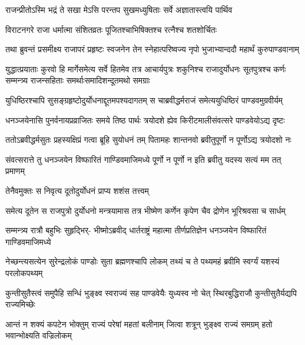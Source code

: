 \twolineshloka
{राजन्प्रीतोऽस्मि भद्रं ते सखा मेऽसि परन्तप}
{सुखमध्युषिताः सर्वे अज्ञातास्त्वयि पार्थिव}



\twolineshloka
{विराटनगरे राजा धर्मात्मा संशितव्रतः}
{पूजितश्चाभिषिक्तश्च रत्नैश्च शतशोर्चितः}


\twolineshloka
{तथा ब्रुवन्तं प्रसमीक्ष्य राजापरं प्रहृष्टः स्वजनेन तेन}
{स्नेहात्परिष्वज्य नृपो भुजाभ्यान्ददौ महार्थं कुरुपाण्डवानाम्}


\threelineshloka
{युद्धात्प्रयाताः कुरवो हि मार्गेसमेत्य सर्वे हितमेव तत्र}
{आचार्यपुत्रः शकुनिश्च राजादुर्योधनः सूतपुत्रश्च कर्णः}
{सम्मन्त्र्य राजन्सहिताः समर्थाःसमादिशन्दूतमथो समग्राः}


\twolineshloka
{युधिष्ठिरश्चापि सुसङ्ग्रहृष्टोदुर्योधनाद्दूतमपश्यदागतम्}
{स चाब्रवीद्धर्मराजं समेत्ययुधिष्ठिरं पाण्डवमुग्रवीर्यम्}


\twolineshloka
{धनञ्जयेनासि पुनर्वनायप्रव्राजितः समये तिष्ठ पार्थः}
{त्रयोदशे ह्येव किरीटमालीसंवत्सरे पाण्डवेयोऽद्य दृष्टः}



\twolineshloka
{ततोऽब्रवीद्धर्मसुतः प्रहस्यक्षिप्रं गत्वा ब्रूहि सुयोधनं तम्}
{पितामहः शान्तनवो ब्रवीतुपूर्णो न पूर्णोऽद्य त्रयोदशो नः}


\fourlineindentedshloka
{संवत्सरात्ते तु धनञ्जयेन}
{विष्फारितं गाण्डिवमाजिमध्ये}
{पूर्णो न पूर्णो न इति ब्रवीतु}
{यदस्य सत्यं मम तत् प्रमाणम्}


\onelineshloka
{तेनैवमुक्तः स निवृत्य दूतोदुर्योधनं प्राप्य शशंस तत्त्वम्}

\fourlineindentedshloka
{समेत्य दूतेन स राजपुत्रो}
{दुर्योधनो मन्त्रयामास तत्र}
{भीष्मेण कर्णेन कृपेण चैव}
{द्रोणेन भूरिश्रवसा च सार्धम्}


\fourlineindentedshloka
{सम्मन्त्र्य रात्रौ बहुभिः सुहृद्भिर्-}
{भीष्मोऽब्रवीद् धार्तराष्ट्रं महात्मा}
{तीर्णप्रतिज्ञेन धनञ्जयेन}
{विष्फारितं गाण्डिवमाजिमध्ये}



\fourlineindentedshloka
{नेच्छन्त्यसत्येन सुरेन्द्रलोकं}
{पाण्डोः सुता ब्रह्मणश्चापि लोकम्}
{तथ्यं च ते पथ्यमहं ब्रवीमि}
{स्वर्ग्यं यशस्यं परलोकपथ्यम्}


\fourlineindentedshloka
{कुन्तीसुतैस्त्वं समुपैहि सन्धिं}
{भुङ्क्ष्व स्वराज्यं सह पाण्डवेयैः}
{युध्यस्व नो चेत् स्थिरबुद्धिराजौ}
{कुन्तीसुतैर्यद्यपि राज्यमिच्छेः}


\fourlineindentedshloka
{आन्तं न शक्यं कपटेन भोक्तुम्}
{राज्यं परेषां महतां बलीनाम्}
{जित्वा शत्रून् भुङ्क्ष्व राज्यं समग्रम्}
{हतो भवान्भोक्ष्यति वज्रिलोकम्}



